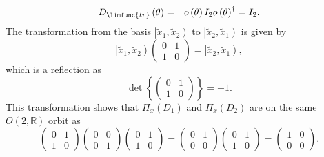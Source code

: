 \documentclass[aps,preprint]{revtex4}
\begin{document}
\begin{enumerate}
\begin{eqnarray}
D_{\limfunc{tr}}\left( \theta \right) &=&o\left( \theta \right) I_{2}o\left(
\theta \right) ^{\dagger }=I_{2}.
\end{eqnarray}%
The transformation from the basis $\left\vert \widetilde{x}_{1},\widetilde{x}%
_{2}\right) $ to $\left\vert \widetilde{x}_{2},\widetilde{x}_{1}\right) $ is
given by 
\begin{equation}
\left\vert \widetilde{x}_{1},\widetilde{x}_{2}\right) \left( 
\begin{array}{cc}
0 & 1 \\ 
1 & 0%
\end{array}%
\right) =\left\vert \widetilde{x}_{2},\widetilde{x}_{1}\right) ,
\end{equation}%
which is a reflection as 
\begin{equation}
\det \left\{ \left( 
\begin{array}{cc}
0 & 1 \\ 
1 & 0%
\end{array}%
\right) \right\} =-1.
\end{equation}%
This transformation shows that $\mathcal{\Pi }_{x}\left( D_{1}\right) $ and $%
\mathcal{\Pi }_{x}\left( D_{2}\right) $ are on the same $O\left( 2,\mathbb{R}%
\right) $ orbit as 
\begin{equation}
\left( 
\begin{array}{cc}
0 & 1 \\ 
1 & 0%
\end{array}%
\right) \left( 
\begin{array}{cc}
0 & 0 \\ 
0 & 1%
\end{array}%
\right) \left( 
\begin{array}{cc}
0 & 1 \\ 
1 & 0%
\end{array}%
\right) =\left( 
\begin{array}{cc}
0 & 1 \\ 
0 & 0%
\end{array}%
\right) \left( 
\begin{array}{cc}
0 & 1 \\ 
1 & 0%
\end{array}%
\right) =\left( 
\begin{array}{cc}
1 & 0 \\ 
0 & 0%
\end{array}%
\right) .
\end{equation}


\end{enumerate}
\end{document}

